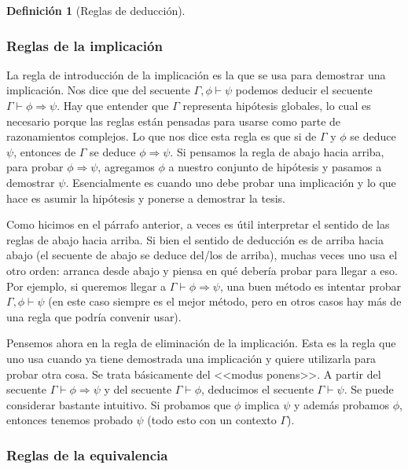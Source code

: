 \documentclass[a4paper, 12pt]{report}
\newcommand{\Ra}{\Rightarrow}
\theoremstyle{definition}
\newtheorem{definicion}[teorema]{Definición}
\begin{document}
\begin{definicion}[Reglas de deducción]
\subsubsection{Reglas de la implicación}

La regla de introducción de la implicación es la que se usa para demostrar una implicación. Nos dice que del secuente $\Gamma,\phi\vdash\psi$ podemos deducir el secuente $\Gamma\vdash\phi\Ra\psi$. Hay que entender que $\Gamma$ representa hipótesis globales, lo cual es necesario porque las reglas están pensadas para usarse como parte de razonamientos complejos. Lo que nos dice esta regla es que si de $\Gamma$ y $\phi$ se deduce $\psi$, entonces de $\Gamma$ se deduce $\phi\Ra\psi$. Si pensamos la regla de abajo hacia arriba, para probar $\phi\Ra\psi$, agregamos $\phi$ a nuestro conjunto de hipótesis y pasamos a demostrar $\psi$. Esencialmente es cuando uno debe probar una implicación y lo que hace es asumir la hipótesis y ponerse a demostrar la tesis.

Como hicimos en el párrafo anterior, a veces es útil interpretar el sentido de las reglas de abajo hacia arriba. Si bien el sentido de deducción es de arriba hacia abajo (el secuente de abajo se deduce del/los de arriba), muchas veces uno usa el otro orden: arranca desde abajo y piensa en qué debería probar para llegar a eso. Por ejemplo, si queremos llegar a $\Gamma\vdash\phi\Ra\psi$, una buen método es intentar probar $\Gamma,\phi\vdash\psi$ (en este caso siempre es el mejor método, pero en otros casos hay más de una regla que podría convenir usar).

Pensemos ahora en la regla de eliminación de la implicación. Esta es la regla que uno usa cuando ya tiene demostrada una implicación y quiere utilizarla para probar otra cosa. Se trata básicamente del <<modus ponens>>. A partir del secuente $\Gamma\vdash\phi\Ra\psi$ y del secuente $\Gamma\vdash\phi$, deducimos el secuente $\Gamma\vdash\psi$. Se puede considerar bastante intuitivo. Si probamos que $\phi$ implica $\psi$ y además probamos $\phi$, entonces tenemos probado $\psi$ (todo esto con un contexto $\Gamma$).

\subsubsection{Reglas de la equivalencia}


\end{definicion}
\end{document}
